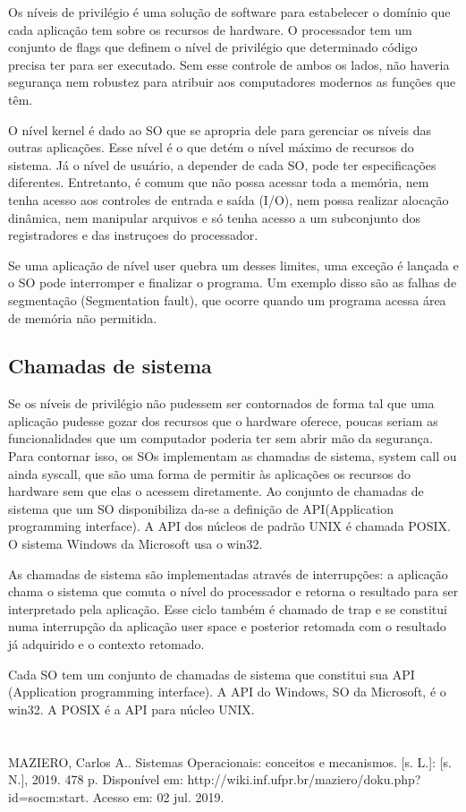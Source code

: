 \documentclass[conference]{IEEEtran}
\begin{document}
Os níveis de privilégio é uma solução de software para estabelecer o domínio que cada aplicação tem sobre os recursos de hardware. O processador tem um conjunto de flags que definem o nível de privilégio que determinado código precisa ter para ser executado. Sem esse controle de ambos os lados, não haveria segurança nem robustez para atribuir aos computadores modernos as funções que têm.

O nível kernel é dado ao SO que se apropria dele para gerenciar os níveis das outras aplicações. Esse nível é o que detém o nível máximo de recursos do sistema. Já o nível de usuário, a depender de cada SO, pode ter especificações diferentes. Entretanto, é comum que não possa acessar toda a memória, nem tenha acesso aos controles de entrada e saída (I/O), nem possa realizar alocação dinâmica, nem manipular arquivos e só tenha acesso a um subconjunto dos registradores e das instruçoes do processador. 

Se uma aplicação de nível user quebra um desses limites, uma exceção é lançada e o SO pode interromper e finalizar o programa. Um exemplo disso são as falhas de segmentação (Segmentation fault), que ocorre quando um programa acessa área de memória não permitida. 

\subsection{Chamadas de sistema}

Se os níveis de privilégio não pudessem ser contornados de forma tal que uma aplicação pudesse gozar dos recursos que o hardware oferece, poucas seriam as funcionalidades que um computador poderia ter sem abrir mão da segurança. Para contornar isso, os SOs implementam as chamadas de sistema, system call ou ainda syscall, que são uma forma de permitir às aplicações os recursos do hardware sem que elas o acessem diretamente. Ao conjunto de chamadas de sistema que um SO disponibiliza da-se a definição de API(Application programming interface). A API dos núcleos de padrão UNIX é chamada POSIX. O sistema Windows da Microsoft usa o win32.

As chamadas de sistema são implementadas através de interrupções: a aplicação chama o sistema que comuta o nível do processador e retorna o resultado para ser interpretado pela aplicação. Esse ciclo também é chamado de trap e se constitui numa interrupção da aplicação user space e posterior retomada com o resultado já adquirido e o contexto retomado.

Cada SO tem um conjunto de chamadas de sistema que constitui sua API (Application programming interface). A API do Windows, SO da Microsoft, é o win32. A POSIX é a API para núcleo UNIX.


\section*{}

\begin{thebibliography}{00}
 MAZIERO, Carlos A.. Sistemas Operacionais: conceitos e mecanismos. [s. L.]: [s. N.], 2019. 478 p. Disponível em: {http://wiki.inf.ufpr.br/maziero/doku.php?id=socm:start}. Acesso em: 02 jul. 2019.
\end{thebibliography}
\end{document}
